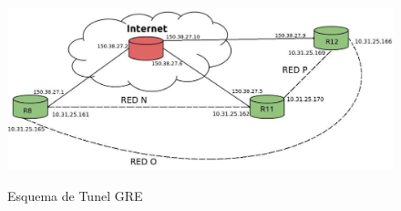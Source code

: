 \begin{figure}
\centering
\includegraphics[width=\textwidth]{gre.jpeg} 
\label{gre}
\caption{Esquema de Tunel GRE}
\end{figure}
